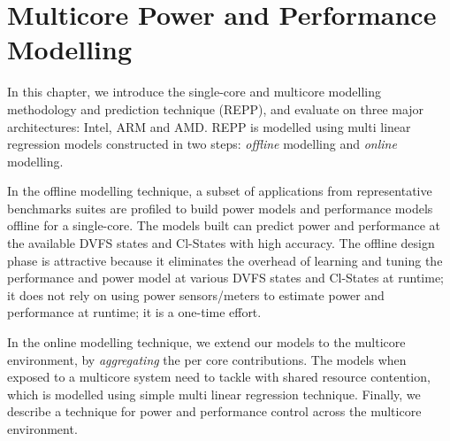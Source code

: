 \chapter{Multicore Power and Performance Modelling}
\label{chap: REPP}

In this chapter, we introduce the single-core and multicore modelling methodology and
prediction technique (REPP), and evaluate on three major architectures: Intel, ARM and
AMD. REPP is modelled using multi linear regression models constructed in two steps:
\textit{offline} modelling and \textit{online} modelling.

\begin{description}[leftmargin=0pt]

     \item[Offline modelling.] In the offline modelling technique, a subset
        of applications from representative benchmarks suites are profiled to build power
        models and performance models offline for a single-core. The models built can
        predict power and performance at the available DVFS states and Cl-States with high
        accuracy. The offline design phase is attractive because {\small {}} it
        eliminates the overhead of learning and tuning the performance and power model at
        various DVFS states and Cl-States at runtime; {\small {}} it does not
        rely on using power sensors/meters to estimate power and performance at runtime;
        {\small {}} it is a one-time effort.  
    
    

    \item[Online modelling.] In the online modelling technique, we extend our models to
        the multicore environment, by \textit{aggregating} the per core contributions. The
        models when exposed to a multicore system need to tackle with shared resource
        contention, which is modelled using simple multi linear regression technique.
        Finally, we describe a technique for power and performance control across the
        multicore environment.  

\end{description}


